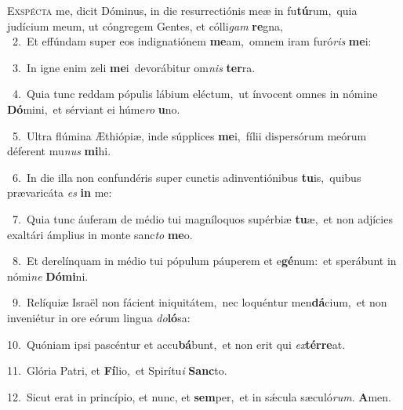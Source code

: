 \lettrine{\initial\textcolor{\initialcolor}{E}}{xspécta} me, dicit Dóminus, in die resurrectiónis meæ in fu\-\textbf{tú}\-rum,~\star quia judícium meum, ut cóngregem Gentes, et cólli\textit{gam} \textbf{re}\-gna,\\
{\numbfont\textcolor{\numbcolor}{~2.}}~Et effúndam super eos indignatiónem \textbf{me}\-am,~\star omnem iram furó\textit{ris} \textbf{me}\-i:\par
{\numbfont\textcolor{\numbcolor}{~3.}}~In igne enim zeli \textbf{me}\-i~\star devorábitur om\textit{nis} \textbf{ter}\-ra.\par
{\numbfont\textcolor{\numbcolor}{~4.}}~Quia tunc reddam pópulis lábium eléctum,~\dagger ut ínvocent omnes in nómine \textbf{Dó}\-mini,~\star et sérviant ei húme\textit{ro} \textbf{u}\-no.\par
{\numbfont\textcolor{\numbcolor}{~5.}}~Ultra flúmina Æthiópiæ, inde súpplices \textbf{me}\-i,~\star fílii dispersórum meórum déferent mu\textit{nus} \textbf{mi}\-hi.\par
{\numbfont\textcolor{\numbcolor}{~6.}}~In die illa non confundéris super cunctis adinventiónibus \textbf{tu}\-is,~\star quibus prævaricáta \textit{es} \textbf{in} me:\par
{\numbfont\textcolor{\numbcolor}{~7.}}~Quia tunc áuferam de médio tui magníloquos supérbiæ \textbf{tu}\-æ,~\star et non adjícies exaltári ámplius in monte sanc\textit{to} \textbf{me}\-o.\par
{\numbfont\textcolor{\numbcolor}{~8.}}~Et derelínquam in médio tui pópulum páuperem et e\-\textbf{gé}\-num:~\star et sperábunt in nómi\textit{ne} \textbf{Dó}\-\textbf{mi}ni.\par
{\numbfont\textcolor{\numbcolor}{~9.}}~Relíquiæ Israël non fácient iniquitátem,~\dagger nec loquéntur men\-\textbf{dá}\-cium,~\star et non inveniétur in ore eórum lingua \textit{do}\-\textbf{ló}sa:\par
{\numbfont\textcolor{\numbcolor}{10.}}~Quóniam ipsi pascéntur et accu\-\textbf{bá}\-bunt,~\star et non erit qui \textit{ex}\-\textbf{tér}\textbf{re}at.\par
{\numbfont\textcolor{\numbcolor}{11.}}~Glória Patri, et \textbf{Fí}\-lio,~\star et Spirítu\textit{i} \textbf{Sanc}\-to.\par
{\numbfont\textcolor{\numbcolor}{12.}}~Sicut erat in princípio, et nunc, et \textbf{sem}\-per,~\star et in sǽcula sæculó\-\textit{rum}\-. \textbf{A}\-men.\par
